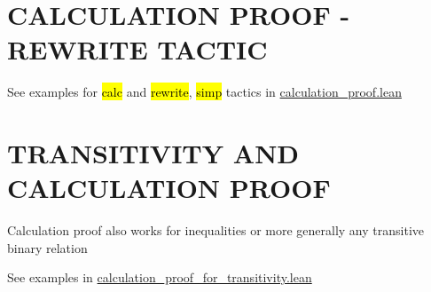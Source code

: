 \section{CALCULATION PROOF - REWRITE TACTIC}

See examples for \hl{calc} and \hl{rewrite}, \hl{simp} tactics in \href{theorem_proving_in_lean_4/theorem_proving/calculation_proof.lean}{calculation\_proof.lean}

\section{TRANSITIVITY AND CALCULATION PROOF}

Calculation proof also works for inequalities or more generally any transitive binary relation

See examples in \href{theorem_proving_in_lean_4/theorem_proving/calculation_proof_for_transitivity.lean}{calculation\_proof\_for\_transitivity.lean}

